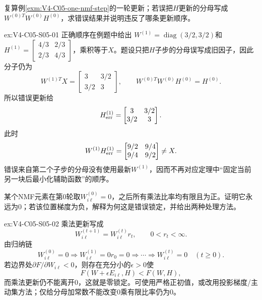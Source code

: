 \begin{SLChapterExercisePairSection}
\begin{exercise}\label{ex:V4-C05-S05-01}
复算例\ref{exm:V4-C05-one-nmf-step}的一轮更新；若误把$H$更新的分母写成$W^{(0)T}W^{(0)}H^{(0)}$，求错误结果并说明违反了哪条更新顺序。
\end{exercise}
\ifSLFullEdition
{}\label{sol:V4-C05-S05-01}
\begin{chapterexercisesolution}{ex:V4-C05-S05-01}
正确顺序在例题中给出
$W^{(1)}=\operatorname{diag}(3/2,3/2)$和
$H^{(1)}=\begin{bmatrix}4/3&2/3\\2/3&4/3\end{bmatrix}$，乘积等于$X$。题设只把$H$子步的分母误写成旧因子，因此分子仍为
\[
W^{(1)T}X=\begin{bmatrix}3&3/2\\3/2&3\end{bmatrix},
\qquad W^{(0)T}W^{(0)}H^{(0)}=H^{(0)}.
\]
所以错误更新给
\[
H_{\rm err}^{(1)}=\begin{bmatrix}3&3/2\\3/2&3\end{bmatrix}.
\]
此时
\[
W^{(1)}H_{\rm err}^{(1)}=
\begin{bmatrix}9/2&9/4\\9/4&9/2\end{bmatrix}\ne X.
\]
错误来自第二个子步的分母没有使用最新$W^{(1)}$，因而不再对应定理中“固定当前另一块后最小化辅助函数”的顺序。
\end{chapterexercisesolution}
\fi

\begin{exercise}\label{ex:V4-C05-S05-02}
某个NMF元素在第0轮取$W_{i\ell}^{(0)}=0$，之后所有乘法比率均有限且为正。证明它永远为0；若该位置梯度为负，解释为何这是错误锁定，并给出两种处理方法。
\end{exercise}
\ifSLFullEdition
{}\label{sol:V4-C05-S05-02}
\begin{chapterexercisesolution}{ex:V4-C05-S05-02}
乘法更新写成
\[
W_{i\ell}^{(t+1)}=W_{i\ell}^{(t)}r_t,
\qquad
0<r_t<\infty.
\]
由归纳链
\[
W_{i\ell}^{(0)}=0
\Longrightarrow W_{i\ell}^{(1)}=0r_0=0
\Longrightarrow\cdots\Longrightarrow
W_{i\ell}^{(t)}=0\quad(t\ge0).
\]
若边界处$\partial F/\partial W_{i\ell}<0$，则存在充分小的$\epsilon>0$使
\[
F(W+\epsilon E_{i\ell},H)<F(W,H),
\]
而乘法更新仍不能离开0，这就是零锁定。可使用严格正初值，或改用投影梯度/主动集方法；仅给分母加常数不能改变$0$乘有限比率仍为0。
\end{chapterexercisesolution}
\fi

\end{SLChapterExercisePairSection}


